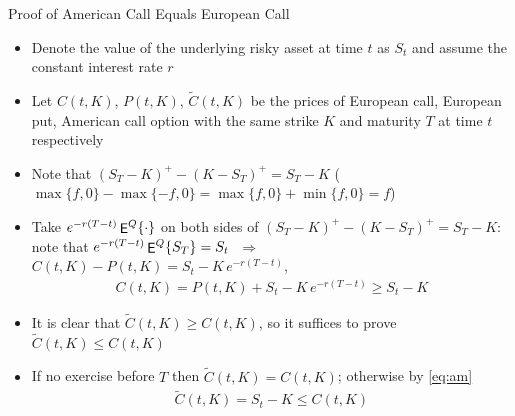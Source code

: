 \documentclass[10pt,handout]{beamer}
\newcommand{\ie}{\;\Longrightarrow\;}
\DeclareMathOperator\expc{{\sf E}}
\theoremstyle{definition}
\begin{document}
\begin{frame}{Proof of American Call Equals European Call}
  \begin{itemize}
    \item Denote the value of the underlying risky asset at time $t$ as $S_t$ and assume the constant interest rate $r$
    \item Let $C(t, K)$, $P(t, K)$, $\widetilde{C}(t, K)$ be the prices of European call, European put, American call option with the same strike $K$ and maturity $T$ at time $t$ respectively 
    \item Note that $(S_T - K)^+ - (K - S_T)^+ = S_T - K$ ($\max\{f, 0\} - \max\{-f, 0\} = \max\{f, 0\} + \min\{f, 0\} = f$) 
    \item Take $e^{-r(T - t)}\expc^Q\{\cdot\}$ on both sides of $(S_T - K)^+ - (K - S_T)^+ = S_T - K$: note that $e^{-r(T - t)}\expc^Q\{S_T\} = S_t$ $\ie$ $C(t, K) - P(t, K) = S_t - K\,e^{-r(T - t)}$, 
      \begin{align}\label{eq:am}
        C(t, K) = P(t, K) + S_t - K\,e^{-r(T - t)} \geqslant S_t - K
      \end{align}
    \item It is clear that $\widetilde{C}(t, K)\geqslant C(t, K)$, so it suffices to prove $\widetilde{C}(t, K)\leqslant C(t, K)$
    \item If no exercise before $T$ then $\widetilde{C}(t, K) = C(t, K)$; otherwise by \eqref{eq:am} 
      \begin{align*}
        \widetilde{C}(t, K) = S_t - K\leqslant C(t, K)
      \end{align*}
  \end{itemize}
\end{frame}
\end{document}

